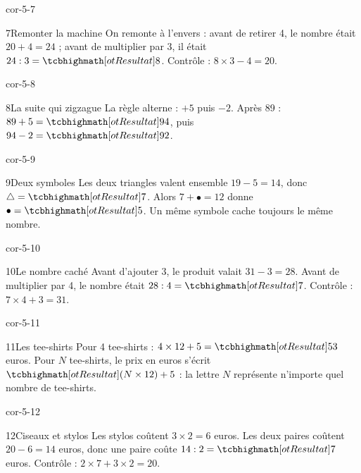 \begin{blocLivre}{cor-5-7}\begin{corrige}{7}{Remonter la machine}
On remonte à l’envers : avant de retirer 4, le nombre était $20+4=24$ ; avant de multiplier par 3, il était $24:3=\res8$. Contrôle : $8\times3-4=20$.
\end{corrige}\end{blocLivre}
\begin{blocLivre}{cor-5-8}\begin{corrige}{8}{La suite qui zigzague}
La règle alterne : $+5$ puis $-2$. Après 89 : $89+5=\res{94}$, puis $94-2=\res{92}$.
\end{corrige}\end{blocLivre}
\begin{blocLivre}{cor-5-9}\begin{corrige}{9}{Deux symboles}
Les deux triangles valent ensemble $19-5=14$, donc $\triangle=\res7$. Alors $7+\bullet=12$ donne $\bullet=\res5$. Un même symbole cache toujours le même nombre.
\end{corrige}\end{blocLivre}
\begin{blocLivre}{cor-5-10}\begin{corrige}{10}{Le nombre caché}
Avant d’ajouter 3, le produit valait $31-3=28$. Avant de multiplier par 4, le nombre était $28:4=\res7$. Contrôle : $7\times4+3=31$.
\end{corrige}\end{blocLivre}
\begin{blocLivre}{cor-5-11}\begin{corrige}{11}{Les tee-shirts}
Pour 4 tee-shirts : $4\times12+5=\res{53}$ euros. Pour $N$ tee-shirts, le prix en euros s’écrit $\res{(N\times12)+5}$ : la lettre $N$ représente n’importe quel nombre de tee-shirts.
\end{corrige}\end{blocLivre}
\begin{blocLivre}{cor-5-12}\begin{corrige}{12}{Ciseaux et stylos}
Les stylos coûtent $3\times2=6$ euros. Les deux paires coûtent $20-6=14$ euros, donc une paire coûte $14:2=\res7$ euros. Contrôle : $2\times7+3\times2=20$.
\end{corrige}\end{blocLivre}
